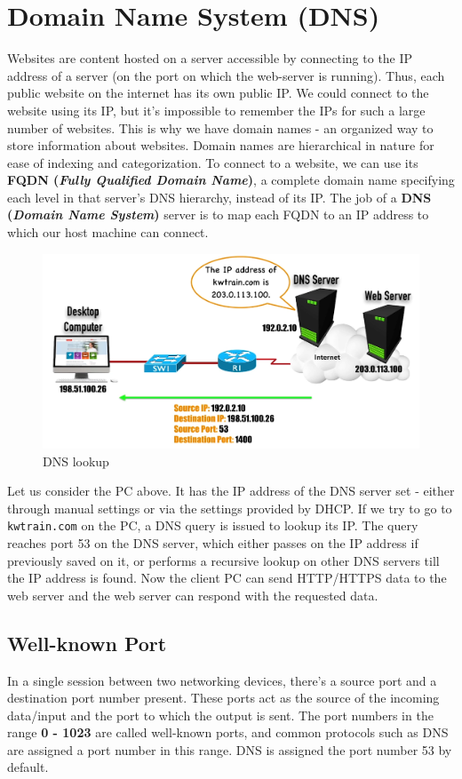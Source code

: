 \section{Domain Name System (DNS)}
Websites are content hosted on a server accessible by connecting to the IP address of a server (on the port on which the web-server is running). Thus, each public website on the internet has its own public IP. We could connect to the website using its IP, but it's impossible to remember the IPs for such a large number of websites. This is why we have domain names - an organized way to store information about websites. Domain names are hierarchical in nature for ease of indexing and categorization. To connect to a website, we can use its \textbf{FQDN (\textit{Fully Qualified Domain Name})}, a complete domain name specifying each level in that server's DNS hierarchy, instead of its IP. The job of a \textbf{DNS (\textit{Domain Name System})} server is to map each FQDN to an IP address to which our host machine can connect.

\begin{figure}[h]
	\centering
	\includegraphics[width=0.9\linewidth]{"Mod1/chapters/1.1.f DNS"}
	\caption{DNS lookup}
	\label{fig:1 DNS Lookup}
\end{figure}

\noindent
Let us consider the PC above. It has the IP address of the DNS server set - either through manual settings or via the settings provided by DHCP. If we try to go to \verb|kwtrain.com| on the PC, a DNS query is issued to lookup its IP. The query reaches port 53 on the DNS server, which either passes on the IP address if previously saved on it, or performs a recursive lookup on other DNS servers till the IP address is found. Now the client PC can send HTTP/HTTPS data to the web server and the web server can respond with the requested data. 

\subsection{Well-known Port}
In a single session between two networking devices, there's a source port and a destination port number present. These ports act as the source of the incoming data/input and the port to which the output is sent. The port numbers in the range \textbf{0 - 1023} are called well-known ports, and common protocols such as DNS are assigned a port number in this range. DNS is assigned the port number 53 by default. 


